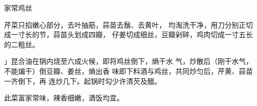 \begin{recipe}{家常鸡丝}

\ingredients



\cooking

\step 芹菜只掐嫩心部分，去叶抽筋，蒜苗去鬚、去黄叶， 均淘洗干净，用刀分别正切成一寸长的节，蒜苗头划成四瓣， 仔姜切成细丝，豆瓣剁碎，鸡肉切成一寸五长的二粗丝。

\step 」昆合油在锅内烧至六成火候，即将鸡丝倒下，熵干水 气，炒散后（刚干水气，不能煸干）倒豆瓣、姜丝，熵出香 味即下料酒与鸡丝，共同炒匀后，芹黄、蒜苗一齐倒下，再 连炒几下。起锅时勾少许清芡及醋。

\notes

此菜富家常味，辣香细嫩，酒饭均宜。

\end{recipe}

